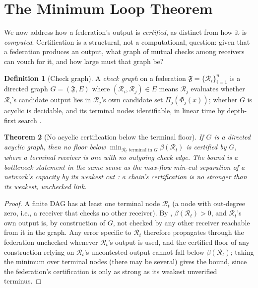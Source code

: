 \documentclass[11pt,twocolumn,a4paper]{article}
\theoremstyle{rdm}
\newtheorem{theorem}{Theorem}[section]
\theoremstyle{definition}
\newtheorem{definition}[theorem]{Definition}
\theoremstyle{remark}
\newcommand{\flo}{\beta}
\newcommand{\Rec}{\mathcal{R}}
\newcommand{\Fed}{\mathfrak{F}}
\begin{document}
\section{The Minimum Loop Theorem}
\label{sec:minloop}

We now address how a federation's output is \emph{certified}, as distinct
from how it is \emph{computed}. Certification is a structural, not a
computational, question: given that a federation produces an output, what
graph of mutual checks among receivers can vouch for it, and how large must
that graph be?

\begin{definition}[Check graph]
\label{def:check-graph}
A \emph{check graph} on a federation $\Fed=\{\Rec_i\}_{i=1}^n$ is a directed
graph $G=(\Fed,E)$ \citep{diestel2017} where $(\Rec_i,\Rec_j)\in E$ means $\Rec_j$ evaluates
whether $\Rec_i$'s candidate output lies in $\Rec_j$'s own candidate set
$\Pi_j(\Phi_j(x))$; whether $G$ is acyclic is decidable, and its terminal
nodes identifiable, in linear time by depth-first search \citep{tarjan1972}.
\end{definition}

\begin{theorem}[No acyclic certification below the terminal floor]
\label{thm:minloop}
If $G$ is a directed acyclic graph, then no floor below
$\min_{\Rec_t \text{ terminal in } G} \flo(\Rec_t)$ is certified by $G$,
where a \emph{terminal} receiver is one with no outgoing check edge. The
bound is a bottleneck statement in the same sense as the max-flow min-cut
separation of a network's capacity by its weakest cut
\citep{menger1927,fordfulkerson1956,edmondskarp1972}: a chain's certification
is no stronger than its weakest, unchecked link.
\end{theorem}

\begin{proof}
A finite DAG has at least one terminal node $\Rec_t$ (a node with
out-degree zero, i.e., a receiver that checks no other receiver). By
, $\flo(\Rec_t)>0$, and $\Rec_t$'s own output is, by
construction of $G$, not checked by any other receiver reachable from it in
the graph. Any error specific to $\Rec_t$ therefore propagates through the
federation unchecked whenever $\Rec_t$'s output is used, and the
certified floor of any construction relying on $\Rec_t$'s uncontested output
cannot fall below $\flo(\Rec_t)$; taking the minimum over terminal nodes
(there may be several) gives the bound, since the federation's certification
is only as strong as its weakest unverified terminus.
\end{proof}
\end{document}
